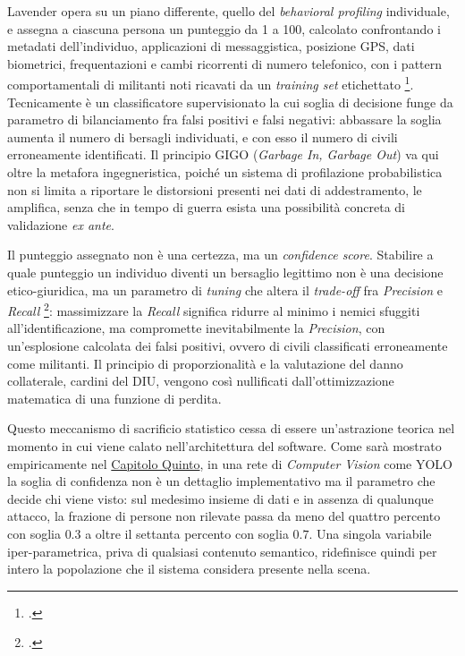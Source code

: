 \documentclass[a4paper,12pt]{report}
\begin{document}
Lavender opera su un piano differente, quello del \textit{behavioral profiling}
individuale, e assegna a ciascuna persona un punteggio da 1 a 100, calcolato
confrontando i metadati dell'individuo, applicazioni di messaggistica, posizione
GPS, dati biometrici, frequentazioni e cambi ricorrenti di numero telefonico, con
i pattern comportamentali di militanti noti ricavati da un \textit{training set}
etichettato \footcite{abraham_2024_lavender}. Tecnicamente è un classificatore
supervisionato la cui soglia di decisione funge da parametro di bilanciamento fra
falsi positivi e falsi negativi: abbassare la soglia aumenta il numero di
bersagli individuati, e con esso il numero di civili erroneamente identificati.
Il principio GIGO (\textit{Garbage In, Garbage Out}) va qui oltre la metafora
ingegneristica, poiché un sistema di profilazione probabilistica non si limita a
riportare le distorsioni presenti nei dati di addestramento, le amplifica, senza
che in tempo di guerra esista una possibilità concreta di validazione
\textit{ex ante}.

Il punteggio assegnato non è una certezza, ma un \textit{confidence score}. Stabilire a quale punteggio un individuo diventi un bersaglio
legittimo non è una decisione etico-giuridica, ma un parametro di \textit{tuning}
che altera il \textit{trade-off} fra \textit{Precision} e \textit{Recall}
\footcite{podar_2025}: massimizzare la \textit{Recall} significa ridurre al minimo
i nemici sfuggiti all'identificazione, ma compromette inevitabilmente la
\textit{Precision}, con un'esplosione calcolata dei falsi positivi, ovvero di
civili classificati erroneamente come militanti. Il principio di proporzionalità e
la valutazione del danno collaterale, cardini del DIU, vengono così nullificati
dall'ottimizzazione matematica di una funzione di perdita.

Questo meccanismo di sacrificio statistico cessa di essere un'astrazione teorica
nel momento in cui viene calato nell'architettura del software. Come sarà
mostrato empiricamente nel \hyperref[cap5]{Capitolo Quinto}, in una rete di \textit{Computer
Vision} come YOLO la soglia di confidenza non è un dettaglio implementativo ma il
parametro che decide chi viene visto: sul medesimo insieme di dati e in assenza
di qualunque attacco, la frazione di persone non rilevate passa da meno del
quattro percento con soglia $0.3$ a oltre il settanta percento con soglia $0.7$.
Una singola variabile iper-parametrica, priva di qualsiasi contenuto semantico,
ridefinisce quindi per intero la popolazione che il sistema considera presente
nella scena.
\end{document}
